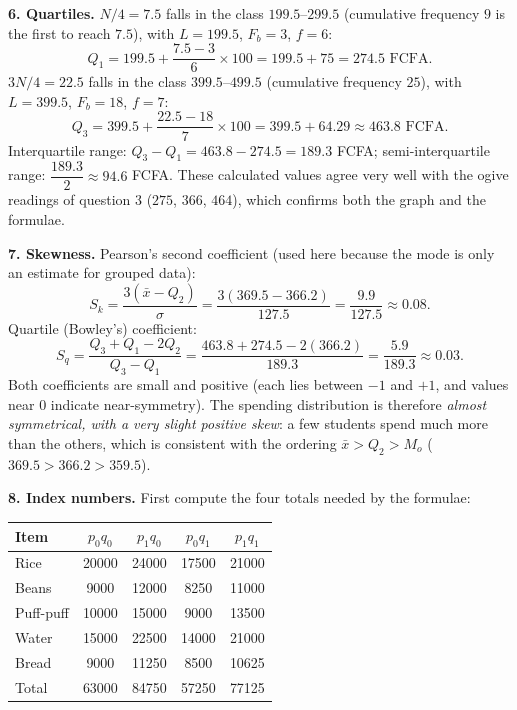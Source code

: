 \documentclass[11pt]{article}
\begin{document}
\textbf{6. Quartiles.} $N/4 = 7.5$ falls in the class $199.5$--$299.5$ (cumulative frequency $9$ is the first to reach $7.5$), with $L = 199.5$, $F_b = 3$, $f = 6$:
\[ Q_1 = 199.5 + \frac{7.5 - 3}{6}\times 100 = 199.5 + 75 = 274.5 \text{ FCFA}. \]
$3N/4 = 22.5$ falls in the class $399.5$--$499.5$ (cumulative frequency $25$), with $L = 399.5$, $F_b = 18$, $f = 7$:
\[ Q_3 = 399.5 + \frac{22.5 - 18}{7}\times 100 = 399.5 + 64.29 \approx 463.8 \text{ FCFA}. \]
Interquartile range: $Q_3 - Q_1 = 463.8 - 274.5 = 189.3$ FCFA; semi-interquartile range: $\dfrac{189.3}{2} \approx 94.6$ FCFA. These calculated values agree very well with the ogive readings of question 3 ($275$, $366$, $464$), which confirms both the graph and the formulae.

\textbf{7. Skewness.} Pearson's second coefficient (used here because the mode is only an estimate for grouped data):
\[ S_k = \frac{3(\bar{x} - Q_2)}{\sigma} = \frac{3(369.5 - 366.2)}{127.5} = \frac{9.9}{127.5} \approx 0.08. \]
Quartile (Bowley's) coefficient:
\[ S_q = \frac{Q_3 + Q_1 - 2Q_2}{Q_3 - Q_1} = \frac{463.8 + 274.5 - 2(366.2)}{189.3} = \frac{5.9}{189.3} \approx 0.03. \]
Both coefficients are small and positive (each lies between $-1$ and $+1$, and values near $0$ indicate near-symmetry). The spending distribution is therefore \emph{almost symmetrical, with a very slight positive skew}: a few students spend much more than the others, which is consistent with the ordering $\bar{x} > Q_2 > M_o$ ($369.5 > 366.2 > 359.5$).

\textbf{8. Index numbers.} First compute the four totals needed by the formulae:

\begin{center}
\begin{tabular}{|l|c|c|c|c|}
\hline
\rowcolor{popblueL} Item & $p_0q_0$ & $p_1q_0$ & $p_0q_1$ & $p_1q_1$ \\
\hline
Rice & 20000 & 24000 & 17500 & 21000 \\
\hline
Beans & 9000 & 12000 & 8250 & 11000 \\
\hline
Puff-puff & 10000 & 15000 & 9000 & 13500 \\
\hline
Water & 15000 & 22500 & 14000 & 21000 \\
\hline
Bread & 9000 & 11250 & 8500 & 10625 \\
\hline
\rowcolor{popblueL} Total & 63000 & 84750 & 57250 & 77125 \\
\hline
\end{tabular}
\end{center}
\end{document}

